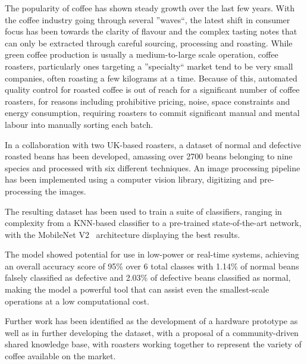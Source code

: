 The popularity of coffee has shown steady growth over the last few years.
With the coffee industry going through several ''waves``, the latest shift in consumer focus has been towards
the clarity of flavour and the complex tasting notes that can only be extracted through careful sourcing, processing and roasting.
While green coffee production is usually a medium-to-large scale operation, coffee roasters, particularly ones targeting a
''specialty`` market tend to be very small companies, often roasting a few kilograms at a time.
Because of this, automated quality control for roasted coffee is out of reach for a significant number of coffee roasters,
for reasons including prohibitive pricing, noise, space constraints and energy consumption, requiring roasters to commit
significant manual and mental labour into manually sorting each batch.

In a collaboration with two UK-based roasters, a dataset of normal and defective roasted beans has been developed, amassing
over 2700 beans belonging to nine species and processed with six different techniques.
An image processing pipeline has been implemented using a computer vision library, digitizing and pre-processing the images.

The resulting dataset has been used to train a suite of classifiers, ranging in complexity from a KNN-based classifier to
a pre-trained state-of-the-art network, with the MobileNet V2~\cite{mobileNet} architecture displaying the best results.

The model showed potential for use in low-power or real-time systems, achieving an overall accuracy score of 95\% over 6 total classes with
1.14\% of normal beans falsely classified as defective and 2.03\% of defective beans classified as normal, making the model
a powerful tool that can assist even the smallest-scale operations at a low computational cost.

Further work has been identified as the development of a hardware prototype as well as in further developing the dataset,
with a proposal of a community-driven shared knowledge base, with roasters working together to represent the variety of coffee
available on the market.
